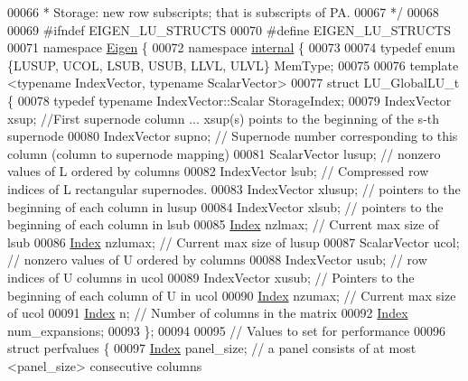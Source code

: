 \begin{DoxyCode}
00066 \textcolor{comment}{ *  Storage: new row subscripts; that is subscripts of PA.}
00067 \textcolor{comment}{ */}
00068 
00069 \textcolor{preprocessor}{#ifndef EIGEN\_LU\_STRUCTS}
00070 \textcolor{preprocessor}{#define EIGEN\_LU\_STRUCTS}
00071 \textcolor{keyword}{namespace }\hyperlink{namespace_eigen}{Eigen} \{
00072 \textcolor{keyword}{namespace }\hyperlink{namespaceinternal}{internal} \{
00073   
00074 \textcolor{keyword}{typedef} \textcolor{keyword}{enum} \{LUSUP, UCOL, LSUB, USUB, LLVL, ULVL\} MemType; 
00075 
00076 \textcolor{keyword}{template} <\textcolor{keyword}{typename} IndexVector, \textcolor{keyword}{typename} ScalarVector>
00077 \textcolor{keyword}{struct }LU\_GlobalLU\_t \{
00078   \textcolor{keyword}{typedef} \textcolor{keyword}{typename} IndexVector::Scalar StorageIndex; 
00079   IndexVector xsup; \textcolor{comment}{//First supernode column ... xsup(s) points to the beginning of the s-th supernode}
00080   IndexVector supno; \textcolor{comment}{// Supernode number corresponding to this column (column to supernode mapping)}
00081   ScalarVector  lusup; \textcolor{comment}{// nonzero values of L ordered by columns }
00082   IndexVector lsub; \textcolor{comment}{// Compressed row indices of L rectangular supernodes. }
00083   IndexVector xlusup; \textcolor{comment}{// pointers to the beginning of each column in lusup}
00084   IndexVector xlsub; \textcolor{comment}{// pointers to the beginning of each column in lsub}
00085   \hyperlink{namespace_eigen_a62e77e0933482dafde8fe197d9a2cfde}{Index}   nzlmax; \textcolor{comment}{// Current max size of lsub}
00086   \hyperlink{namespace_eigen_a62e77e0933482dafde8fe197d9a2cfde}{Index}   nzlumax; \textcolor{comment}{// Current max size of lusup}
00087   ScalarVector  ucol; \textcolor{comment}{// nonzero values of U ordered by columns }
00088   IndexVector usub; \textcolor{comment}{// row indices of U columns in ucol}
00089   IndexVector xusub; \textcolor{comment}{// Pointers to the beginning of each column of U in ucol }
00090   \hyperlink{namespace_eigen_a62e77e0933482dafde8fe197d9a2cfde}{Index}   nzumax; \textcolor{comment}{// Current max size of ucol}
00091   \hyperlink{namespace_eigen_a62e77e0933482dafde8fe197d9a2cfde}{Index}   n; \textcolor{comment}{// Number of columns in the matrix  }
00092   \hyperlink{namespace_eigen_a62e77e0933482dafde8fe197d9a2cfde}{Index}   num\_expansions; 
00093 \};
00094 
00095 \textcolor{comment}{// Values to set for performance}
00096 \textcolor{keyword}{struct }perfvalues \{
00097   \hyperlink{namespace_eigen_a62e77e0933482dafde8fe197d9a2cfde}{Index} panel\_size; \textcolor{comment}{// a panel consists of at most <panel\_size> consecutive columns}

\end{DoxyCode}
